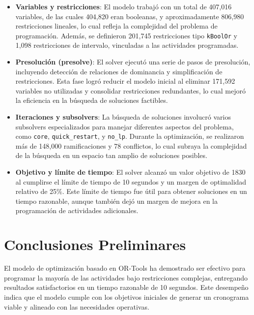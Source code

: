 \documentclass{article}
\begin{document}
\begin{itemize}
    \item \textbf{Variables y restricciones}: El modelo trabajó con un total de 407,016 variables, de las cuales 404,820 eran booleanas, y aproximadamente 806,980 restricciones lineales, lo cual refleja la complejidad del problema de programación. Además, se definieron 201,745 restricciones tipo \texttt{kBoolOr} y 1,098 restricciones de intervalo, vinculadas a las actividades programadas.\\

    \item \textbf{Presolución (presolve)}: El solver ejecutó una serie de pasos de presolución, incluyendo detección de relaciones de dominancia y simplificación de restricciones. Esta fase logró reducir el modelo inicial al eliminar 171,592 variables no utilizadas y consolidar restricciones redundantes, lo cual mejoró la eficiencia en la búsqueda de soluciones factibles.\\

    \item \textbf{Iteraciones y subsolvers}: La búsqueda de soluciones involucró varios subsolvers especializados para manejar diferentes aspectos del problema, como \texttt{core}, \texttt{quick\_restart}, y \texttt{no\_lp}. Durante la optimización, se realizaron más de 148,000 ramificaciones y 78 conflictos, lo cual subraya la complejidad de la búsqueda en un espacio tan amplio de soluciones posibles.\\

    \item \textbf{Objetivo y límite de tiempo}: El solver alcanzó un valor objetivo de 1830 al cumplirse el límite de tiempo de 10 segundos y un margen de optimalidad relativo de 25\%. Este límite de tiempo fue útil para obtener soluciones en un tiempo razonable, aunque también dejó un margen de mejora en la programación de actividades adicionales.
\end{itemize}

\section{Conclusiones Preliminares}

El modelo de optimización basado en OR-Tools ha demostrado ser efectivo para programar la mayoría de las actividades bajo restricciones complejas, entregando resultados satisfactorios en un tiempo razonable de 10 segundos. Este desempeño indica que el modelo cumple con los objetivos iniciales de generar un cronograma viable y alineado con las necesidades operativas.
\end{document}
